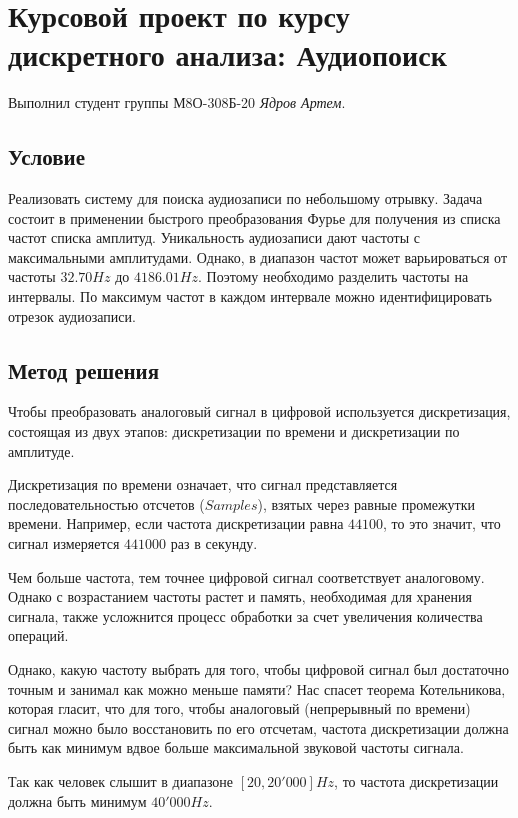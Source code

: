 \documentclass[12pt]{article}
\begin{document}
	
	\section*{Курсовой проект по курсу дискретного анализа: Аудиопоиск}
	
	Выполнил студент группы М8О-308Б-20 \textit{Ядров Артем}.
	
	\subsection*{Условие}
Реализовать систему для поиска аудиозаписи по небольшому отрывку.\newline
Задача состоит в применении быстрого преобразования Фурье для получения из списка частот списка амплитуд. 
Уникальность аудиозаписи дают частоты с максимальными амплитудами. Однако, в диапазон частот может варьироваться от частоты $32.70 Hz$ до $4186.01 Hz$.	 Поэтому необходимо разделить частоты на интервалы.
По максимум частот в каждом интервале можно идентифицировать отрезок аудиозаписи. 
	
	\subsection*{Метод решения}
	Чтобы преобразовать аналоговый сигнал в цифровой используется дискретизация, состоящая из двух этапов: дискретизации по времени и дискретизации по амплитуде.
	
	Дискретизация по времени означает, что сигнал представляется последовательностью отсчетов ($Samples$), взятых через равные промежутки времени.\newline
	Например, если частота дискретизации равна $44100$, то это значит, что сигнал измеряется $441000$ раз в секунду.
	
	Чем больше частота, тем точнее цифровой сигнал соответствует аналоговому. Однако с возрастанием частоты растет и память, необходимая для хранения сигнала, также усложнится процесс обработки за счет увеличения количества операций.
	
	Однако, какую частоту выбрать для того, чтобы цифровой сигнал был достаточно точным и занимал как можно меньше памяти? Нас спасет теорема Котельникова, которая гласит, что для того, чтобы аналоговый (непрерывный по времени)  сигнал можно было восстановить по его отсчетам, частота дискретизации должна быть как минимум вдвое больше максимальной звуковой частоты сигнала.
	
	Так как человек слышит в диапазоне $[20, 20'000] Hz$, то частота дискретизации должна быть минимум $40'000 Hz$.
	
\end{document}
